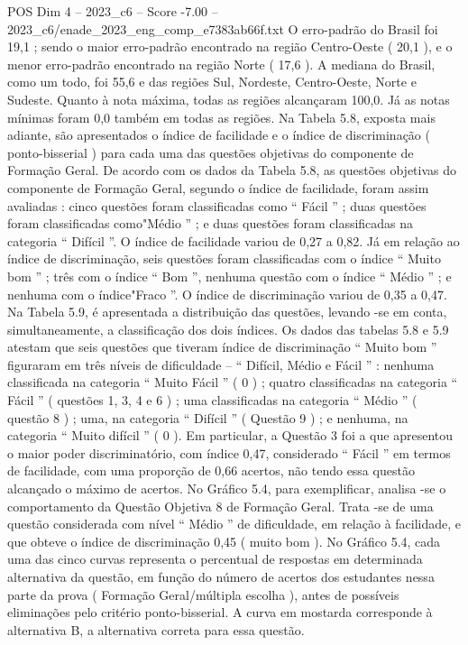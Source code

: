 \begin{textsample}{POS Dim 4 – 2023\_c6 – Score -7.00 – 2023\_c6/enade\_2023\_eng\_comp\_e7383ab66f.txt}
O erro-padrão do Brasil foi 19,1 ; sendo o maior erro-padrão encontrado na região Centro-Oeste ( 20,1 ), e o menor erro-padrão encontrado na região Norte ( 17,6 ).
A mediana do Brasil, como um todo, foi 55,6 e das regiões Sul, Nordeste, Centro-Oeste, Norte e Sudeste.
Quanto à nota máxima, todas as regiões alcançaram 100,0.
Já as notas mínimas foram 0,0 também em todas as regiões.
Na Tabela 5.8, exposta mais adiante, são apresentados o índice de facilidade e o índice de discriminação ( ponto-bisserial ) para cada uma das questões objetivas do componente de Formação Geral.
De acordo com os dados da Tabela 5.8, as questões objetivas do componente de Formação Geral, segundo o índice de facilidade, foram assim avaliadas : cinco questões foram classificadas como “ Fácil ” ; duas questões foram classificadas como"Médio ” ; e duas questões foram classificadas na categoria “ Difícil ”.
O índice de facilidade variou de 0,27 a 0,82.
Já em relação ao índice de discriminação, seis questões foram classificadas com o índice “ Muito bom ” ; três com o índice “ Bom ”, nenhuma questão com o índice “ Médio ” ; e nenhuma com o índice"Fraco ”.
O índice de discriminação variou de 0,35 a 0,47.
Na Tabela 5.9, é apresentada a distribuição das questões, levando -se em conta, simultaneamente, a classificação dos dois índices.
Os dados das tabelas 5.8 e 5.9 atestam que seis questões que tiveram índice de discriminação “ Muito bom ” figuraram em três níveis de dificuldade – “ Difícil, Médio e Fácil ” : nenhuma classificada na categoria “ Muito Fácil ” ( 0 ) ; quatro classificadas na categoria “ Fácil ” ( questões 1, 3, 4 e 6 ) ; uma classificadas na categoria “ Médio ” ( questão 8 ) ; uma, na categoria “ Difícil ” ( Questão 9 ) ; e nenhuma, na categoria “ Muito difícil ” ( 0 ).
Em particular, a Questão 3 foi a que apresentou o maior poder discriminatório, com índice 0,47, considerado “ Fácil ” em termos de facilidade, com uma proporção de 0,66 acertos, não tendo essa questão alcançado o máximo de acertos.
No Gráfico 5.4, para exemplificar, analisa -se o comportamento da Questão Objetiva 8 de Formação Geral.
Trata -se de uma questão considerada com nível “ Médio ” de dificuldade, em relação à facilidade, e que obteve o índice de discriminação 0,45 ( muito bom ).
No Gráfico 5.4, cada uma das cinco curvas representa o percentual de respostas em determinada alternativa da questão, em função do número de acertos dos estudantes nessa parte da prova ( Formação Geral/múltipla escolha ), antes de possíveis eliminações pelo critério ponto-bisserial.
A curva em mostarda corresponde à alternativa B, a alternativa correta para essa questão.

\end{textsample}
